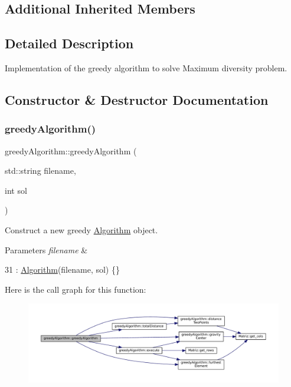 \subsection*{Additional Inherited Members}


\subsection{Detailed Description}
Implementation of the greedy algorithm to solve Maximum diversity problem. 

\subsection{Constructor \& Destructor Documentation}
\mbox{\label{classgreedyAlgorithm_ad2ec161ba440c1a8f35b26823e37ca6b}} 
\subsubsection{\texorpdfstring{greedy\+Algorithm()}{greedyAlgorithm()}}
{\footnotesize\ttfamily greedy\+Algorithm\+::greedy\+Algorithm (\begin{DoxyParamCaption}\item[{std\+::string}]{filename,  }\item[{int}]{sol }\end{DoxyParamCaption})\hspace{0.3cm}{\ttfamily [inline]}}



Construct a new greedy \hyperlink{classAlgorithm}{Algorithm} object. 


\begin{DoxyParams}{Parameters}
{\em filename} & \\
\hline
\end{DoxyParams}

\begin{DoxyCode}
31 : \hyperlink{classAlgorithm_a3c199c8528aae86f06ac515d5102fa09}{Algorithm}(filename, sol) \{\}
\end{DoxyCode}
Here is the call graph for this function\+:
\nopagebreak
\begin{figure}[H]
\begin{center}
\leavevmode
\includegraphics[width=350pt]{classgreedyAlgorithm_ad2ec161ba440c1a8f35b26823e37ca6b_cgraph}
\end{center}
\end{figure}


